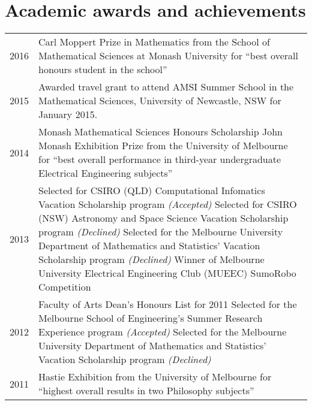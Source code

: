 \documentclass[12pt,a4paper]{article}
\newenvironment{llist}
  {\renewcommand{\arraystretch}{1.5}\begin{longtable}{p{3.5cm} p{12cm}}}
  {\end{longtable}}
\begin{document}
\section*{Academic awards and achievements}

\begin{llist}
  2016 & Carl Moppert Prize in Mathematics from the School of Mathematical Sciences at
         Monash University for ``best overall honours student in the school'' \\
  2015 & Awarded travel grant to attend AMSI Summer School in the Mathematical
         Sciences, University of Newcastle, NSW for January 2015. \\
  2014 & Monash Mathematical Sciences Honours Scholarship \newline \newline
         John Monash Exhibition Prize from the University of Melbourne for ``best overall
         performance in third-year undergraduate Electrical Engineering subjects'' \\
  2013 & Selected for CSIRO (QLD) Computational Infomatics Vacation Scholarship
         program \textit{(Accepted)} \newline \newline
         Selected for CSIRO (NSW) Astronomy and Space Science Vacation
         Scholarship program \textit{(Declined)}\newline \newline
         Selected for the Melbourne University Department of Mathematics and
         Statistics' Vacation Scholarship program \textit{(Declined)} \newline \newline
         Winner of Melbourne University Electrical Engineering Club (MUEEC)
         SumoRobo Competition \\
  2012 & Faculty of Arts Dean's Honours List for 2011 \newline \newline
         Selected for the Melbourne School of Engineering's Summer Research
         Experience program \textit{(Accepted)} \newline \newline
         Selected for the Melbourne University Department of Mathematics and
         Statistics' Vacation Scholarship program \textit{(Declined)} \\
  2011 & Hastie Exhibition from the University of Melbourne for ``highest overall results in two
         Philosophy subjects''
\end{llist}
\end{document}
